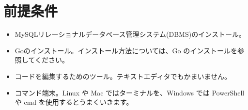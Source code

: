 \section{前提条件}

\begin{itemize}
\item MySQLリレーショナルデータベース管理システム(DBMS)のインストール。
\item Goのインストール。インストール方法については、Go のインストールを参照してください。
\item コードを編集するためのツール。テキストエディタでもかまいません。
\item コマンド端末。Linux や Mac ではターミナルを、Windows では PowerShell や cmd を使用するとうまくいきます。
\end{itemize}
